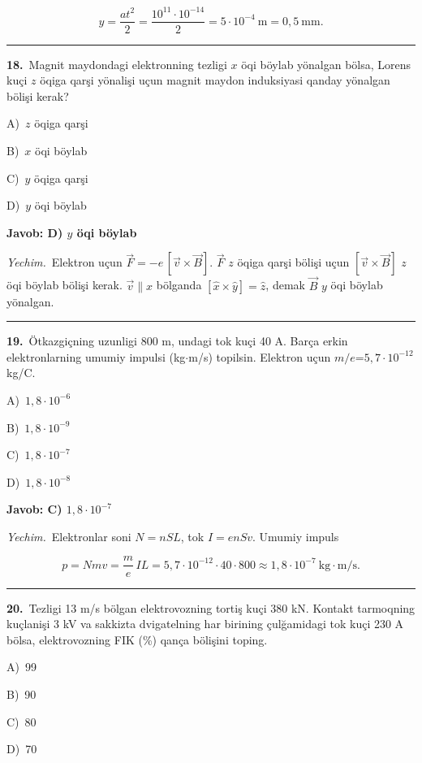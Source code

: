 \documentclass[11pt,a4paper]{article}
\newcommand{\opt}[2]{\hspace*{4mm}#1)\ #2\par}
\begin{document}
\[y=\frac{at^2}{2}=\frac{10^{11}\cdot10^{-14}}{2}=5\cdot10^{-4}\ \text{m}=0{,}5\ \text{mm}.\]\par\medskip\hrule\medskip
{}\noindent\begin{minipage}{\linewidth}
\textbf{18.}\ Magnit maydondagi elektronning tezligi $x$ öqi böylab yönalgan bölsa, Lorens kuçi $z$ öqiga qarşi yönalişi uçun magnit maydon induksiyasi qanday yönalgan bölişi kerak?\par\smallskip
\opt{A}{$z$ öqiga qarşi}
\opt{B}{$x$ öqi böylab}
\opt{C}{$y$ öqiga qarşi}
\opt{D}{$y$ öqi böylab}
\end{minipage}\vspace{2pt}\par
\noindent\colorbox{gray!12}{\parbox{\dimexpr\linewidth-2\fboxsep}{\textbf{Javob: D) $y$ öqi böylab}}}\par\smallskip
\noindent\textit{Yechim.}\ Elektron uçun $\vec F=-e\,[\vec v\times\vec B]$. $\vec F$ $z$ öqiga qarşi bölişi uçun $[\vec v\times\vec B]$ $z$ öqi böylab bölişi kerak. $\vec v\parallel x$ bölganda $[\hat x\times\hat y]=\hat z$, demak $\vec B$ $y$ öqi böylab yönalgan.\par\par\medskip\hrule\medskip
{}\noindent\begin{minipage}{\linewidth}
\textbf{19.}\ Ötkazgiçning uzunligi 800 m, undagi tok kuçi 40 A. Barça erkin elektronlarning umumiy impulsi (kg$\cdot$m/s) topilsin. Elektron uçun $m/e$=$5{,}7\cdot10^{-12}$ kg/C.\par\smallskip
\opt{A}{$1{,}8\cdot10^{-6}$}
\opt{B}{$1{,}8\cdot10^{-9}$}
\opt{C}{$1{,}8\cdot10^{-7}$}
\opt{D}{$1{,}8\cdot10^{-8}$}
\end{minipage}\vspace{2pt}\par
\noindent\colorbox{gray!12}{\parbox{\dimexpr\linewidth-2\fboxsep}{\textbf{Javob: C) $1{,}8\cdot10^{-7}$}}}\par\smallskip
\noindent\textit{Yechim.}\ Elektronlar soni $N=nSL$, tok $I=enSv$. Umumiy impuls\par
\[p=Nmv=\frac{m}{e}\,IL=5{,}7\cdot10^{-12}\cdot40\cdot800\approx1{,}8\cdot10^{-7}\ \text{kg}\cdot\text{m/s}.\]\par\medskip\hrule\medskip
{}\noindent\begin{minipage}{\linewidth}
\textbf{20.}\ Tezligi 13 m/s bölgan elektrovozning tortiş kuçi 380 kN. Kontakt tarmoqning kuçlanişi 3 kV va sakkizta dvigatelning har birining çulğamidagi tok kuçi 230 A bölsa, elektrovozning FIK (\%) qança bölişini toping.\par\smallskip
\opt{A}{99}
\opt{B}{90}
\opt{C}{80}
\opt{D}{70}
\end{minipage}\vspace{2pt}\par
\end{document}
